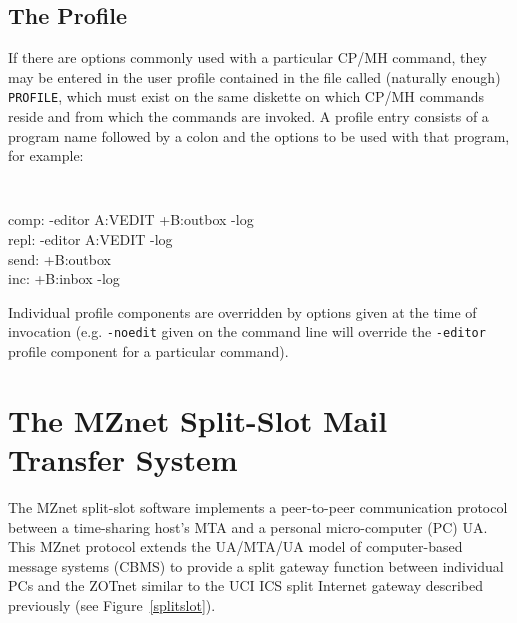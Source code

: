 \subsection*	{The Profile}
If there are options commonly used with a particular CP/MH command, 
they may be entered in the user profile contained in the file called 
(naturally enough) {\tt PROFILE}, which must exist on the same diskette on 
which CP/MH commands reside and from which the commands are invoked.  
A profile entry consists of a program name followed by a colon and 
the options to be used with that program, for example:

{\tt
\begin{flushleft}
\hspace{1in} comp: -editor A:VEDIT +B:outbox -log \\
\hspace{1in} repl: -editor A:VEDIT -log \\
\hspace{1in} send: +B:outbox \\
\hspace{1in} inc: +B:inbox -log
\end{flushleft}
}

Individual profile components are overridden by options given at
the time of invocation (e.g. {\tt -noedit} given on the command line
will override the {\tt -editor} profile component for a particular command).

\section*	{The MZnet Split-Slot Mail Transfer System}
The MZnet split-slot software implements a peer-to-peer
communication protocol between a time-sharing host's MTA and a personal 
micro-computer (PC) UA.
This MZnet protocol extends the UA/MTA/UA model of
computer-based message systems (CBMS) to provide a
split gateway function between individual PCs and the ZOTnet
similar to the UCI ICS split Internet gateway described previously
(see Figure~\ref{splitslot}).

